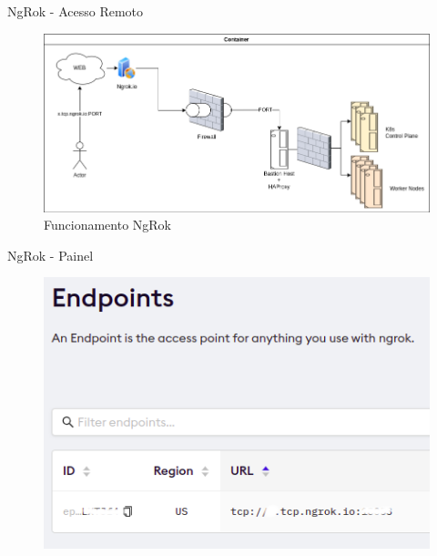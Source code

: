 \documentclass[10pt,brazil]{beamer}
\theoremstyle{definition}
\begin{document}
\begin{frame}[plain]{NgRok - Acesso Remoto}
  \hspace*{-10mm}
  \begin{figure}
    \includegraphics[width=.85\paperwidth]{ngroktcp.png}
  \caption[Funcionamnto NgRok]{Funcionamento NgRok}
  \end{figure}
\end{frame}

\begin{frame}[plain]{NgRok - Painel}
 \hspace*{-10mm}
  \begin{figure}
    \centering  
  \includegraphics[width=0.5\paperwidth]{ngrok.png}
\end{figure}
\end{frame}


\end{document}
